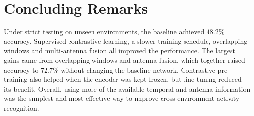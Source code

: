 
\section{Concluding Remarks}
\label{sec:conclusions}

Under strict testing on unseen environments, the baseline achieved $48.2\%$
accuracy. Supervised contrastive learning, a slower training schedule,
overlapping windows and multi-antenna fusion all improved the performance. The
largest gains came from overlapping windows and antenna fusion, which together
raised accuracy to $\mathbf{72.7\%}$ without changing the baseline network.
\newpage
Contrastive pre-training also helped when the encoder was kept frozen, but
fine-tuning reduced its benefit. Overall, using more of the available temporal
and antenna information was the simplest and most effective way to improve
cross-environment activity recognition.
